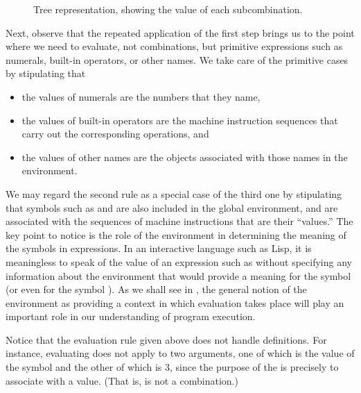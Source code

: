 \begin{figure}[tb]
	\centering
	
	\caption{
		Tree representation, showing the value of each subcombination.
	}
	\label{Figure 1.1}
\end{figure}

Next, observe that the repeated application of the first step brings us to the point where we need to evaluate, not combinations, but primitive expressions such as numerals, built-in operators, or other names.
We take care of the primitive cases by stipulating that
\begin{itemize}

	\item
	the values of numerals are the numbers that they name,

	\item
	the values of built-in operators are the machine instruction sequences that
	carry out the corresponding operations, and

	\item
	the values of other names are the objects associated with those names in the
	environment.

\end{itemize}
We may regard the second rule as a special case of the third one by stipulating that symbols such as \code{+} and \code{*} are also included in the global environment, and are associated with the sequences of machine instructions that are their “values.”
The key point to notice is the role of the environment in determining the meaning of the symbols in expressions.
In an interactive language such as Lisp, it is meaningless to speak of the value of an expression such as  without specifying any information about the environment that would provide a meaning for the symbol  (or even for the symbol \code{+}).
As we shall see in , the general notion of the environment as providing a context in which evaluation takes place will play an important role in our understanding of program execution.

Notice that the evaluation rule given above does not handle definitions.
For instance, evaluating  does not apply  to two arguments, one of which is the value of the symbol  and the other of which is 3, since the purpose of the  is precisely to associate  with a value.
(That is,  is not a combination.)

